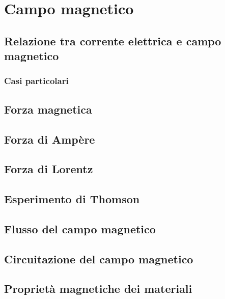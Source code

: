 
\section{Campo magnetico}

\subsection{Relazione tra corrente elettrica e campo magnetico}

\subsubsection{Casi particolari}

\subsection{Forza magnetica}

\subsection{Forza di Ampère}

\subsection{Forza di Lorentz}

\subsection{Esperimento di Thomson}

\subsection{Flusso del campo magnetico}

\subsection{Circuitazione del campo magnetico}

\subsection{Proprietà magnetiche dei materiali}
